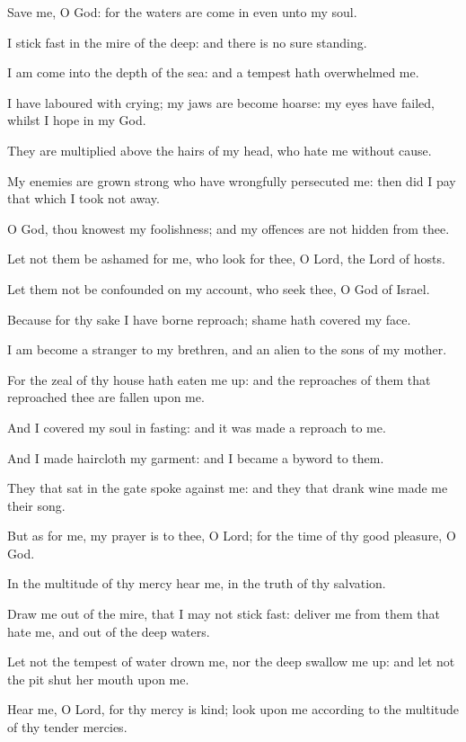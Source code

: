 ﻿\item Save me, O God: for the waters are come in even unto my soul.
\item I stick fast in the mire of the deep: and there is no sure standing.
\item I am come into the depth of the sea: and a tempest hath overwhelmed me.
\item I have laboured with crying; my jaws are become hoarse: my eyes have failed, whilst I hope in my God.
\item They are multiplied above the hairs of my head, who hate me without cause.
\item My enemies are grown strong who have wrongfully persecuted me: then did I pay that which I took not away.
\item O God, thou knowest my foolishness; and my offences are not hidden from thee.
\item Let not them be ashamed for me, who look for thee, O Lord, the Lord of hosts.
\item Let them not be confounded on my account, who seek thee, O God of Israel.
\item Because for thy sake I have borne reproach; shame hath covered my face.
\item I am become a stranger to my brethren, and an alien to the sons of my mother.
\item For the zeal of thy house hath eaten me up: and the reproaches of them that reproached thee are fallen upon me.
\item And I covered my soul in fasting: and it was made a reproach to me.
\item And I made haircloth my garment: and I became a byword to them.
\item They that sat in the gate spoke against me: and they that drank wine made me their song.
\item But as for me, my prayer is to thee, O Lord; for the time of thy good pleasure, O God.
\item In the multitude of thy mercy hear me, in the truth of thy salvation.
\item Draw me out of the mire, that I may not stick fast: deliver me from them that hate me, and out of the deep waters.
\item Let not the tempest of water drown me, nor the deep swallow me up: and let not the pit shut her mouth upon me.
\item Hear me, O Lord, for thy mercy is kind; look upon me according to the multitude of thy tender mercies.
